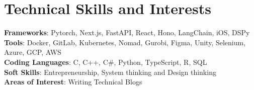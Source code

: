 \documentclass[a4paper,11pt]{article}
\begin{document}
\section{\textbf{Technical Skills and Interests}}
\begin{itemize}[leftmargin=0.05in, label={}]
  \small{\item{
                \textbf{Frameworks}{: Pytorch, Next.js, FastAPI, React, Hono, LangChain, iOS, DSPy} \\
                \textbf{Tools}{: Docker, GitLab, Kubernetes, Nomad, Gurobi, Figma, Unity, Selenium, Azure, GCP, AWS} \\
                \textbf{Coding Languages}{: C, C++, C\#, Python, TypeScript, R, SQL} \\
                \textbf{Soft Skills}{: Entrepreneurship, System thinking and Design thinking} \\
                \textbf{Areas of Interest}{: Writing Technical Blogs} \\
          }}
\end{itemize}
\vspace{-16pt}
\end{document}
